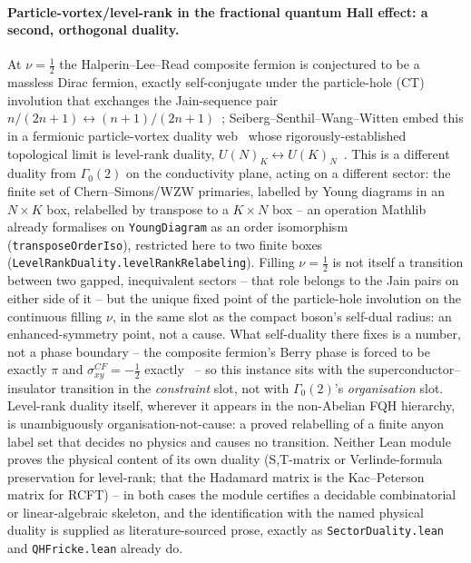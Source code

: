 \documentclass[11pt,a4paper]{article}
\newcommand{\lean}[1]{\texttt{\small #1}}
\begin{document}
\paragraph{Particle-vortex/level-rank in the fractional quantum Hall effect: a second, orthogonal duality.} At
$\nu=\tfrac12$ the Halperin--Lee--Read composite fermion is conjectured to be a massless Dirac fermion, exactly
self-conjugate under the particle-hole (CT) involution that exchanges the Jain-sequence pair
$n/(2n+1)\leftrightarrow(n+1)/(2n+1)$~\cite{Son2015}; Seiberg--Senthil--Wang--Witten embed this in a fermionic
particle-vortex duality web~\cite{SeibergSenthilWangWitten2016} whose rigorously-established topological limit is
level-rank duality, $U(N)_K\leftrightarrow U(K)_N$~\cite{HsinSeiberg2016,NaculichSchnitzer2007}. This is a
different duality from $\Gamma_0(2)$ on the conductivity plane, acting on a different sector: the finite set of
Chern--Simons/WZW primaries, labelled by Young diagrams in an $N\times K$ box, relabelled by transpose to a
$K\times N$ box -- an operation Mathlib already formalises on \lean{YoungDiagram} as an order isomorphism
(\lean{transposeOrderIso}), restricted here to two finite boxes (\lean{LevelRankDuality.levelRankRelabeling}).
Filling $\nu=\tfrac12$ is not itself a transition between two gapped, inequivalent sectors -- that role belongs to
the Jain pairs on either side of it -- but the unique fixed point of the particle-hole involution on the
continuous filling $\nu$, in the same slot as the compact boson's self-dual radius: an enhanced-symmetry point,
not a cause. What self-duality there fixes is a number, not a phase boundary -- the composite fermion's Berry
phase is forced to be exactly $\pi$ and $\sigma^{CF}_{xy}=-\tfrac12$ exactly~\cite{Son2015} -- so this instance
sits with the superconductor--insulator transition in the \emph{constraint} slot, not with $\Gamma_0(2)$'s
\emph{organisation} slot. Level-rank duality itself, wherever it appears in the non-Abelian FQH hierarchy, is
unambiguously organisation-not-cause: a proved relabelling of a finite anyon label set that decides no physics
and causes no transition. Neither Lean module proves the physical content of its own duality (S,T-matrix or
Verlinde-formula preservation for level-rank; that the Hadamard matrix is the Kac--Peterson matrix for RCFT) --
in both cases the module certifies a decidable combinatorial or linear-algebraic skeleton, and the identification
with the named physical duality is supplied as literature-sourced prose, exactly as \lean{SectorDuality.lean} and
\lean{QHFricke.lean} already do.
\end{document}

